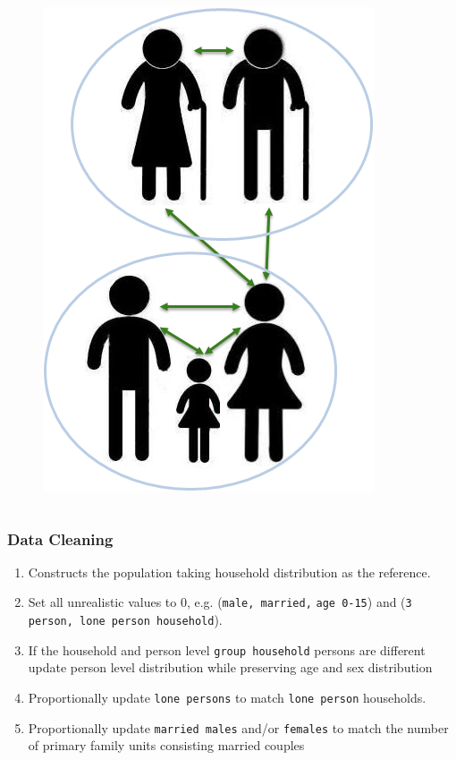 \begin{frame}
\begin{columns}[T]
\begin{column}{.29\textwidth}
\begin{figure}
\includegraphics[scale=0.3]{images/family-compo}
\end{figure}

         
        \end{column}%
    \end{columns}%
   
  \end{frame}%
  
  \newcommand{\seti}{\setcounter{saveenumi}{\value{enumi}}}
  \newcommand{\conti}{\setcounter{enumi}{\value{saveenumi}}}%
\begin{frame} \frametitle{Data Cleaning} %
	\begin{enumerate}%
		\setlength\itemsep{1em}%
		\item Constructs the population taking household distribution as the 
		reference.%
		\item Set all unrealistic values to 0, e.g. (\texttt{male, married,} 
		\texttt{age
			0-15})	and (\texttt{3 person, lone person household}).%
		\item If the household and person level \texttt{group household} 
		persons are
		different update person level distribution while preserving age and sex
		distribution \item Proportionally update \texttt{lone persons} to match
		\texttt{lone person} households. %
		\item Proportionally update \texttt{married males} and/or 
		\texttt{females} to
		match the number of primary family units consisting married couples%
		
		\seti%
\end{enumerate} \end{frame}
  
